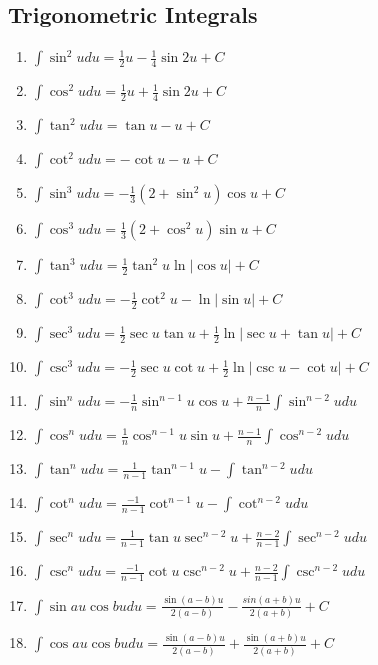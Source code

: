 \documentclass[12pt, letterpaper]{article}
\begin{document}
\subsection{Trigonometric Integrals}
\begin{enumerate}
  \item $\int \limits \sin ^2 u du = \frac{1}{2} u - \frac{1}{4} \sin 2u +C$
  \item $\int \limits \cos ^2 u du = \frac{1}{2} u + \frac{1}{4} \sin 2u +C$
  \item $\int \limits \tan ^2 u du = \tan u -u +C$
  \item $\int \limits \cot ^2 u du = -\cot u -u +C$
  \item $\int \limits \sin ^3 u du = -\frac{1}{3} (2 + \sin ^2 u) \cos u +C$
  \item $\int \limits \cos ^3 u du = \frac{1}{3} (2 + \cos^2 u) \sin u +C$
  \item $\int \limits \tan ^3 u du = \frac{1}{2} \tan ^2 u \ln | \cos u | +C$
  \item $\int \limits \cot ^3 u du = -\frac{1}{2} \cot ^2 u - \ln | \sin u | + C$
  \item $\int \limits \sec ^3 u du = \frac{1}{2} \sec u \tan u + \frac{1}{2} \ln | \sec u + \tan u | +C$
  \item $\int \limits \csc ^3 u du = -\frac{1}{2} \sec u \cot u + \frac{1}{2} \ln | \csc u - \cot u | +C$
  \item $\int \limits \sin ^n u du = -\frac{1}{n} \sin ^{n-1} u \cos u + \frac{n-1}{n} \int \limits \sin ^{n-2} u du$
  \item $\int \limits \cos ^n u du = \frac{1}{n} \cos ^{n-1} u \sin u + \frac{n-1}{n} \int \limits \cos ^{n-2} u du$
  \item $\int \limits \tan ^n u du = \frac{1}{n-1} \tan ^{n-1} u -\int \limits \tan ^{n-2} u du$
  \item $\int \limits \cot ^n u du = \frac{-1}{n-1} \cot ^{n-1} u - \int \limits \cot ^{n-2} u du$
  \item $\int \limits \sec ^n u du = \frac{1}{n-1} \tan u \sec ^{n-2} u + \frac{n-2}{n-1} \int \limits \sec ^{n-2} u du$
  \item $\int \limits \csc ^n u du = \frac{-1}{n-1} \cot u \csc ^{n-2} u + \frac{n-2}{n-1} \int \limits \csc ^{n-2} u du$
  \item $\int \limits \sin au \cos bu du = \frac{\sin(a-b)u}{2(a-b)} - \frac{sin(a+b)u}{2(a+b)} +C$
  \item $\int \limits \cos au \cos bu du = \frac{\sin(a-b)u}{2(a-b)} + \frac{\sin(a+b)u}{2(a+b)} +C$

\end{enumerate}
\end{document}
